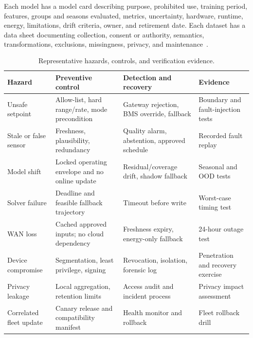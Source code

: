 Each model has a model card describing purpose, prohibited use, training period, features, groups and seasons evaluated, metrics, uncertainty, hardware, runtime, energy, limitations, drift criteria, owner, and retirement date. Each dataset has a data sheet documenting collection, consent or authority, semantics, transformations, exclusions, missingness, privacy, and maintenance~\cite{mitchell2019modelcards,gebru2021datasheets}.

\begin{table}[t]
	\centering
	\caption{Representative hazards, controls, and verification evidence.}
	\label{tab:hazards}
	\begin{tabularx}{\textwidth}{p{}p{}X p{}}
		\toprule
		Hazard                  & Preventive control                             & Detection and recovery                       & Evidence                           \\
		\midrule
		Unsafe setpoint         & Allow-list, hard range/rate, mode precondition & Gateway rejection, BMS override, fallback    & Boundary and fault-injection tests \\
		Stale or false sensor   & Freshness, plausibility, redundancy            & Quality alarm, abstention, approved schedule & Recorded fault replay              \\
		Model shift             & Locked operating envelope and no online update & Residual/coverage drift, shadow fallback     & Seasonal and OOD tests             \\
		Solver failure          & Deadline and feasible fallback trajectory      & Timeout before write                         & Worst-case timing test             \\
		WAN loss                & Cached approved inputs; no cloud dependency    & Freshness expiry, energy-only fallback       & 24-hour outage test                \\
		Device compromise       & Segmentation, least privilege, signing         & Revocation, isolation, forensic log          & Penetration and recovery exercise  \\
		Privacy leakage         & Local aggregation, retention limits            & Access audit and incident process            & Privacy impact assessment          \\
		Correlated fleet update & Canary release and compatibility manifest      & Health monitor and rollback                  & Fleet rollback drill               \\
		\bottomrule
	\end{tabularx}
\end{table}
